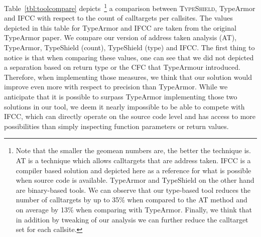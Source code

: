 Table~\ref{tbl:toolcompare} depicts~\footnote{Note that the smaller the geomean numbers are,
	the better the technique is. AT is a technique which allows calltargets that are address taken. 
	IFCC is a compiler based solution and depicted here as a reference for what is possible when 
	source code is available. TypeArmor and TypeShield on the other hand are binary-based tools. 
	We can observe that our type-based tool reduces the number of calltargets by up to 35\% when 
	compared to the AT method and on average by 13\% when comparing with TypeArmor. 
	Finally, we think that in addition by tweaking of our analysis we can further reduce the calltarget set for each callsite.
}
a comparison between \textsc{TypeShield}, TypeArmor and IFCC with respect to the count of calltargets per callsites. 
The values depicted in this table for TypeArmor and IFCC are taken from the original TypeArmor paper.
We compare our version of address taken analysis (AT), TypeArmor, TypeShield (count), TypeShield (type) and IFCC. The first 
thing to notice is that when comparing these values, one can see that we did not depicted a separation based on return type or the 
CFC that TypeArmour introduced. Therefore, when implementing those measures, we think that our solution would improve even 
more with respect to precision than TypeArmor. While we anticipate that it is possible to surpass TypeArmor implementing those two solutions 
in our tool, we deem it nearly impossible to be able to compete with IFCC, which can directly operate on the source code level 
and has access to more possibilities than simply inspecting function parameters or return values.
